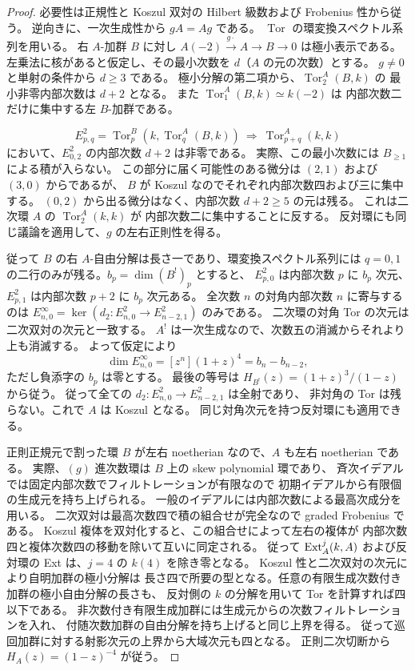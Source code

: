\begin{proof}
必要性は正規性と Koszul 双対の Hilbert 級数および Frobenius 性から従う。
逆向きに、一次生成性から $gA=Ag$ である。
$\operatorname{Tor}$ の環変換スペクトル系列を用いる。
右 $A$-加群 $B$ に対し $A(-2)\xrightarrow{g\cdot}A\to B\to0$ は極小表示である。
左乗法に核があると仮定し、その最小次数を $d$（$A$ の元の次数）とする。
$g\ne0$ と単射の条件から $d\ge3$ である。
極小分解の第二項から、$\operatorname{Tor}^A_2(B,k)$ の
最小非零内部次数は $d+2$ となる。
また $\operatorname{Tor}^A_1(B,k)\simeq k(-2)$ は
内部次数二だけに集中する左 $B$-加群である。

\[
 E^2_{p,q}=\operatorname{Tor}^B_p(k,\operatorname{Tor}^A_q(B,k))
 \ \Longrightarrow\ \operatorname{Tor}^A_{p+q}(k,k)
\]
において、$E^2_{0,2}$ の内部次数 $d+2$ は非零である。
実際、この最小次数には $B_{\ge1}$ による積が入らない。
この部分に届く可能性のある微分は $(2,1)$ および $(3,0)$ からであるが、
$B$ が Koszul なのでそれぞれ内部次数四および三に集中する。
$(0,2)$ から出る微分はなく、内部次数 $d+2\ge5$ の元は残る。
これは二次環 $A$ の $\operatorname{Tor}^A_2(k,k)$ が
内部次数二に集中することに反する。
反対環にも同じ議論を適用して、$g$ の左右正則性を得る。

従って $B$ の右 $A$-自由分解は長さ一であり、環変換スペクトル系列には
$q=0,1$ の二行のみが残る。$b_p=\dim(B^!)_p$ とすると、
$E^2_{p,0}$ は内部次数 $p$ に $b_p$ 次元、
$E^2_{p,1}$ は内部次数 $p+2$ に $b_p$ 次元ある。
全次数 $n$ の対角内部次数 $n$ に寄与するのは
$E^\infty_{n,0}=\ker(d_2:E^2_{n,0}\to E^2_{n-2,1})$ のみである。
二次環の対角 Tor の次元は二次双対の次元と一致する。
$A^!$ は一次生成なので、次数五の消滅からそれより上も消滅する。
よって仮定により
\[
 \dim E^\infty_{n,0}
 = [z^n](1+z)^4
 = b_n-b_{n-2},
\]
ただし負添字の $b_p$ は零とする。
最後の等号は $H_{B^!}(z)=(1+z)^3/(1-z)$ から従う。
従って全ての $d_2:E^2_{n,0}\to E^2_{n-2,1}$ は全射であり、
非対角の Tor は残らない。これで $A$ は Koszul となる。
同じ対角次元を持つ反対環にも適用できる。

正則正規元で割った環 $B$ が左右 noetherian なので、$A$ も左右 noetherian である。
実際、$(g)$ 進次数環は $B$ 上の skew polynomial 環であり、
斉次イデアルでは固定内部次数でフィルトレーションが有限なので
初期イデアルから有限個の生成元を持ち上げられる。
一般のイデアルには内部次数による最高次成分を用いる。
二次双対は最高次数四で積の組合せが完全なので graded Frobenius である。
Koszul 複体を双対化すると、この組合せによって左右の複体が
内部次数四と複体次数四の移動を除いて互いに同定される。
従って $\operatorname{Ext}_A^j(k,A)$ および反対環の Ext は、$j=4$ の $k(4)$ を除き零となる。
Koszul 性と二次双対の次元により自明加群の極小分解は
長さ四で所要の型となる。任意の有限生成次数付き加群の極小自由分解の長さも、
反対側の $k$ の分解を用いて Tor を計算すれば四以下である。
非次数付き有限生成加群には生成元からの次数フィルトレーションを入れ、
付随次数加群の自由分解を持ち上げると同じ上界を得る。
従って巡回加群に対する射影次元の上界から大域次元も四となる。
正則二次切断から $H_A(z)=(1-z)^{-4}$ が従う。
\end{proof}
